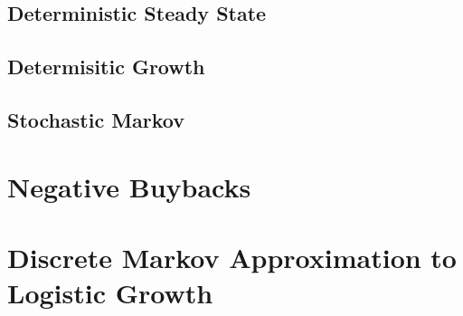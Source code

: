 \documentclass[12pt]{article}
\begin{document}
  \subsection{Deterministic Steady State} \label{sec:dss}
    

  \subsection{Determisitic Growth} \label{sec:dg}
    

  \subsection{Stochastic Markov} \label{sec:sm}
    

\appendix

\section{Negative Buybacks} \label{app:nbb}
  

\section{Discrete Markov Approximation to Logistic Growth} \label{app:dmc}
  
\end{document}
